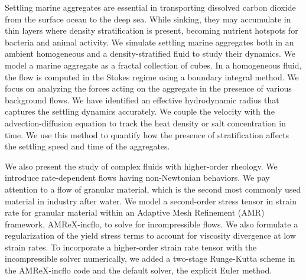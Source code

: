 
\par
Settling marine aggregates are essential in transporting dissolved carbon dioxide from the surface ocean to the deep sea. While sinking, they may accumulate in thin layers where density stratification is present, becoming nutrient hotspots for bacteria and animal activity. We simulate settling marine aggregates both in an ambient homogeneous and a density-stratified fluid to study their dynamics. 
We model a marine aggregate as a fractal collection of cubes. 
In a homogeneous fluid, the flow is computed in the Stokes regime using a boundary integral method.
We focus on analyzing the forces acting on the aggregate in the presence of various background flows.
We have identified an effective hydrodynamic radius that captures the settling dynamics accurately.
We couple the velocity with the advection-diffusion equation to track the heat density or salt concentration in time. We use this method to quantify how the presence of stratification affects the settling speed and time of the aggregates.

\par
We also present the study of complex fluids with higher-order rheology. We introduce rate-dependent flows having non-Newtonian behaviors. 
We pay attention to a flow of granular material, which is the second most commonly used material in industry after water.
We model a second-order stress tensor in strain rate for granular material
within an Adaptive Mesh Refinement (AMR) framework, AMReX-incflo, to solve for incompressible flows.
We also formulate a regularization of the yield stress terms to account for viscosity divergence at low strain rates. 
To incorporate a higher-order strain rate tensor with the incompressible solver numerically, we added a two-stage Runge-Kutta scheme in the AMReX-incflo code and the default solver, the explicit Euler method.